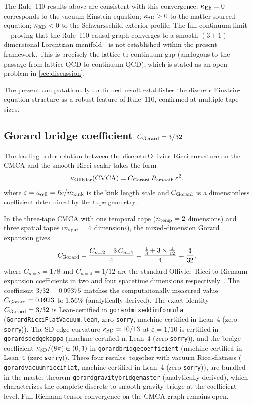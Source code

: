 \documentclass[11pt]{article}
\theoremstyle{remark}
\newcommand{\lean}[1]{%
  \penalty-100
  \begingroup\def\_{\textunderscore\allowbreak}\texttt{#1}\endgroup}
\newcommand{\CatAL}{machine-certified in Lean~4 (zero \texttt{sorry})}
\newcommand{\CatAD}{analytically derived}
\newcommand{\kEE}{\kappa_{\rm EE}}
\newcommand{\kSD}{\kappa_{\rm SD}}
\newcommand{\kXD}{\kappa_{\rm XD}}
\begin{document}
The Rule~110 results above are consistent with this convergence:
$\kEE = 0$ corresponds to the vacuum Einstein equation;
$\kSD > 0$ to the matter-sourced equation;
$\kXD < 0$ to the Schwarzschild-exterior profile.
The full continuum limit---proving that the Rule~110 causal graph converges
to a smooth $(3+1)$-dimensional Lorentzian manifold---is not established
within the present framework.
This is precisely the lattice-to-continuum gap (analogous to the
passage from lattice QCD to continuum QCD), which is stated as an open
problem in \cref{sec:discussion}.

The present computationally confirmed result establishes the discrete Einstein-equation
structure as a robust feature of Rule~110, confirmed at multiple tape sizes.

\subsection{Gorard bridge coefficient \texorpdfstring{$C_{\rm Gorard} = 3/32$}{C\_Gorard = 3/32}}
\label{ssec:gorard_bridge_coeff}

The leading-order relation between the discrete Ollivier--Ricci curvature on the CMCA
and the smooth Ricci scalar takes the form
\begin{equation}
  \kappa_{\rm Ollivier}({\rm CMCA}) = C_{\rm Gorard}\,R_{\rm smooth}\,\varepsilon^2,
  \label{eq:gorard_bridge}
\end{equation}
where $\varepsilon = a_{\rm cell} = \hbar c / m_{\rm kink}$ is the kink length scale
and $C_{\rm Gorard}$ is a dimensionless coefficient determined by the tape geometry.

In the three-tape CMCA with one temporal tape ($n_{\rm temp} = 2$ dimensions) and three
spatial tapes ($n_{\rm spat} = 4$ dimensions), the mixed-dimension Gorard expansion gives
\begin{equation}
  C_{\rm Gorard}
  = \frac{C_{n=2} + 3\,C_{n=4}}{4}
  = \frac{\tfrac{1}{8} + 3 \times \tfrac{1}{12}}{4}
  = \frac{3}{32},
  \label{eq:cgorard_analytic}
\end{equation}
where $C_{n=2} = 1/8$ and $C_{n=4} = 1/12$ are the standard Ollivier--Ricci-to-Riemann
expansion coefficients in two and four spacetime dimensions respectively~\cite{Ollivier2007}.
The coefficient $3/32 = 0.09375$ matches the computationally measured value
$C_{\rm Gorard} = 0.0923$ to $1.56\%$ (\CatAD).
The exact identity $C_{\rm Gorard} = 3/32$ is Lean-certified in
\lean{gorard\_mixed\_dim\_formula} (\texttt{GorardRicciFlatVacuum.lean}, zero \texttt{sorry}, \CatAL).
The SD-edge curvature $\kappa_{\rm SD} = 10/13$ at $\varepsilon = 1/10$ is certified in
\lean{gorard\_sd\_edge\_kappa} (\CatAL), and the bridge coefficient
$\kappa_{\rm SD}/(8\pi) \in (0,1)$ in \lean{gorard\_bridge\_coefficient} (\CatAL).
These four results, together with vacuum Ricci-flatness
(\lean{gorard\_vacuum\_ricci\_flat}, \CatAL), are bundled in the master theorem
\lean{gorard\_gravity\_bridge\_master} (\CatAD), which characterizes the complete
discrete-to-smooth gravity bridge at the coefficient level.
Full Riemann-tensor convergence on the CMCA graph remains open.
\end{document}
